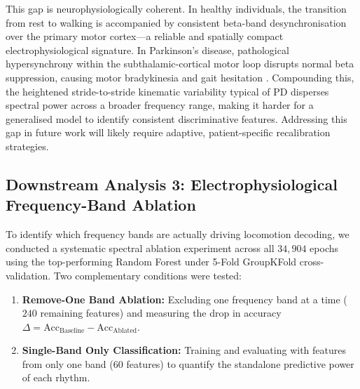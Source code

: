 \documentclass[11pt,a4paper]{article}
\renewcommand{\arraystretch}{1.15}
\begin{document}
\begin{table}[htbp]
\centering
\caption{Cross-Subject Decoding Stratification by Clinical Diagnostic Cohort}
\label{tab:clinical_stratification}
\vspace{0.4em}
\renewcommand{\arraystretch}{1.25}
\end{table}

This gap is neurophysiologically coherent. In healthy individuals, the transition from rest to walking is accompanied by consistent beta-band desynchronisation over the primary motor cortex---a reliable and spatially compact electrophysiological signature. In Parkinson's disease, pathological hypersynchrony within the subthalamic-cortical motor loop disrupts normal beta suppression, causing motor bradykinesia and gait hesitation \cite{orban2024dataset, gilat2021locomotion}. Compounding this, the heightened stride-to-stride kinematic variability typical of PD disperses spectral power across a broader frequency range, making it harder for a generalised model to identify consistent discriminative features. Addressing this gap in future work will likely require adaptive, patient-specific recalibration strategies.

\subsection{Downstream Analysis 3: Electrophysiological Frequency-Band Ablation}
\label{sec:band_ablation}
To identify which frequency bands are actually driving locomotion decoding, we conducted a systematic spectral ablation experiment across all $34{,}904$ epochs using the top-performing Random Forest under 5-Fold GroupKFold cross-validation. Two complementary conditions were tested:
\begin{enumerate}
    \item \textbf{Remove-One Band Ablation:} Excluding one frequency band at a time ($240$ remaining features) and measuring the drop in accuracy $\Delta = \text{Acc}_{\text{Baseline}} - \text{Acc}_{\text{Ablated}}$.
    \item \textbf{Single-Band Only Classification:} Training and evaluating with features from only one band ($60$ features) to quantify the standalone predictive power of each rhythm.
\end{enumerate}
\end{document}
